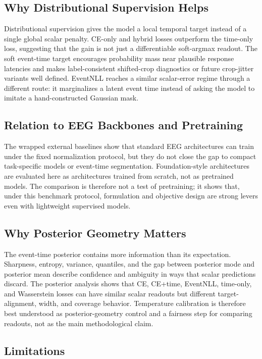 \documentclass[12pt]{article}
\begin{document}
\subsection{Why Distributional Supervision Helps}

Distributional supervision gives the model a local temporal target instead of a single global scalar penalty. CE-only and hybrid losses outperform the time-only loss, suggesting that the gain is not just a differentiable soft-argmax readout. The soft event-time target encourages probability mass near plausible response latencies and makes label-consistent shifted-crop diagnostics or future crop-jitter variants well defined. EventNLL reaches a similar scalar-error regime through a different route: it marginalizes a latent event time instead of asking the model to imitate a hand-constructed Gaussian mask.

\subsection{Relation to EEG Backbones and Pretraining}

The wrapped external baselines show that standard EEG architectures can train under the fixed normalization protocol, but they do not close the gap to compact task-specific models or event-time segmentation. Foundation-style architectures are evaluated here as architectures trained from scratch, not as pretrained models. The comparison is therefore not a test of pretraining; it shows that, under this benchmark protocol, formulation and objective design are strong levers even with lightweight supervised models.

\subsection{Why Posterior Geometry Matters}

The event-time posterior contains more information than its expectation. Sharpness, entropy, variance, quantiles, and the gap between posterior mode and posterior mean describe confidence and ambiguity in ways that scalar predictions discard. The posterior analysis shows that CE, CE+time, EventNLL, time-only, and Wasserstein losses can have similar scalar readouts but different target-alignment, width, and coverage behavior. Temperature calibration is therefore best understood as posterior-geometry control and a fairness step for comparing readouts, not as the main methodological claim.

\subsection{Limitations}
\end{document}

